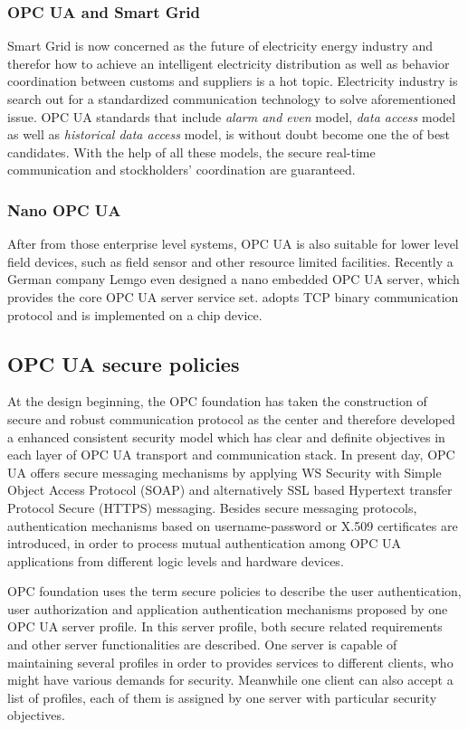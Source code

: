 \subsubsection{OPC UA and  Smart Grid}
Smart Grid is now concerned as the future of electricity energy industry and therefor how to achieve an intelligent electricity distribution as well as behavior coordination between customs and suppliers is a hot topic\cite{opc_grid}. Electricity industry is search out for a standardized communication technology to solve aforementioned issue.
OPC UA standards that include \emph{alarm and even} model, \emph{data access} model as well as  \emph{historical data access} model, is without doubt become one the of best candidates. With the help of all these models,  the secure real-time communication and stockholders' coordination are guaranteed.

\subsubsection{Nano OPC UA }
After from those enterprise level systems, OPC UA is also suitable for lower level field devices, such as field sensor and other resource limited facilities. Recently a German company Lemgo even designed a nano embedded OPC UA server\cite{opc_lemgo}, which provides the core OPC UA server service set. adopts TCP binary communication protocol  and  is implemented on a chip device.

\subsection{OPC UA secure policies}
At the design beginning, the OPC foundation has taken the construction of secure and robust communication protocol as the center and therefore developed a enhanced consistent security model which has clear and definite objectives in each layer of OPC UA transport and communication stack. In present day, OPC UA  offers secure messaging mechanisms by applying WS Security with Simple Object Access Protocol (SOAP)  and alternatively SSL based Hypertext transfer Protocol Secure (HTTPS) messaging\cite{opc_secure_1}. Besides secure messaging protocols,  authentication mechanisms based on username-password or X.509 certificates are introduced, in order to process mutual authentication among OPC UA applications from different logic levels and hardware devices.

OPC foundation uses the term secure policies\cite{O2} to describe the 
user authentication, user authorization and application authentication mechanisms proposed by one OPC UA server profile. In this server profile, both secure related requirements and other server functionalities are described. One server is capable of maintaining several profiles in order to provides services to different clients, who might have various demands for security. Meanwhile one client can also accept a list of profiles, each of them is assigned by one server with particular security objectives. 

